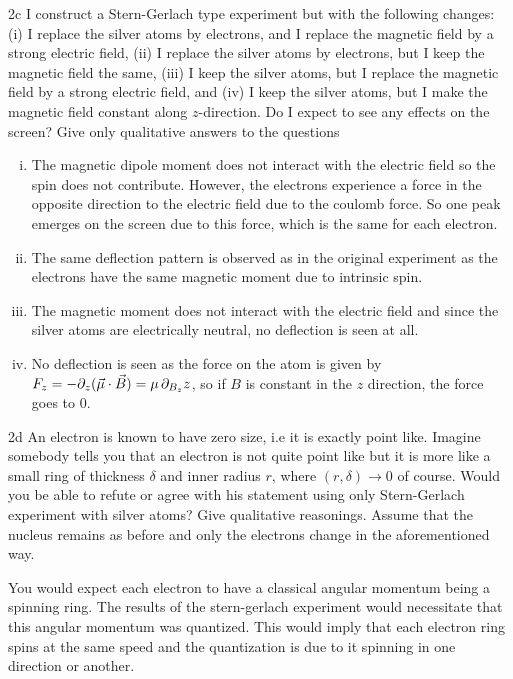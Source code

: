 \documentclass[12pt]{article}
\begin{document}
\begin{exc}{2c}
    I construct a Stern-Gerlach type experiment but with the following
    changes: (i) I replace the silver atoms by electrons, and I replace the
    magnetic field by a strong electric field, (ii) I replace the silver atoms
    by electrons, but I keep the magnetic field the same, (iii) I keep the
    silver atoms, but I replace the magnetic field by a strong electric field,
    and (iv) I keep the silver atoms, but I make the magnetic field constant
    along $z$-direction. Do I expect to see any effects on the screen? Give
    only qualitative answers to the questions
\end{exc}
\begin{ans}
\begin{enumerate}[(i)]
    \item The magnetic dipole moment does not interact with the electric field so the spin does not contribute. However, the electrons experience a force in the opposite direction to the electric field due to the coulomb force. So one peak emerges on the screen due to this force, which is the same for each electron.
    \item The same deflection pattern is observed as in the original experiment as the electrons have the same magnetic moment due to intrinsic spin.
    \item The magnetic moment does not interact with the electric field and since the silver atoms are electrically neutral, no deflection is seen at all.
    \item No deflection is seen as the force on the atom is given by $F_z = -\partial_z(\vec \mu \cdot \vec B) = \mu \pdif{B_z}{z}$, so if $B$ is constant in the $z$ direction, the force goes to 0.
\end{enumerate}
\end{ans}

\begin{exc}{2d}
An electron is known to have zero size, i.e it is exactly point like. Imagine somebody tells you that an electron is not quite point like but it is
more like a small ring of thickness $\delta$ and inner radius $r$, where $(r, \delta) \to 0$ of course. Would you be able to refute or agree with his statement using only Stern-Gerlach experiment with silver atoms? Give qualitative
reasonings. Assume that the nucleus remains as before and only the
electrons change in the aforementioned way.
\end{exc}
\begin{ans}
    You would expect each electron to have a classical angular momentum being a spinning ring. The results of the stern-gerlach experiment would necessitate that this angular momentum was quantized. This would imply that each electron ring spins at the same speed and the quantization is due to it spinning in one direction or another.
\end{ans}
\end{document}
